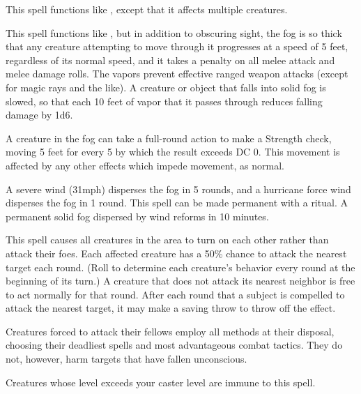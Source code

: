 \begin{spelleffect}
    This spell functions like , except that it affects multiple creatures.
\end{spelleffect}

\spelldur{\durmed}
\begin{spelleffect}
    This spell functions like , but in addition to obscuring sight, the fog is so thick that any creature attempting to move through it progresses at a speed of 5 feet, regardless of its normal speed, and it takes a  penalty on all melee attack and melee damage rolls. The vapors prevent effective ranged weapon attacks (except for magic rays and the like). A creature or object that falls into solid fog is slowed, so that each 10 feet of vapor that it passes through reduces falling damage by 1d6.
    \par A creature in the fog can take a full-round action to make a Strength check, moving 5 feet for every 5 by which the result exceeds DC 0. This movement is affected by any other effects which impede movement, as normal.
\end{spelleffect}
\begin{spellnotes}
    A severe wind (31\add mph) disperses the fog in 5 rounds, and a hurricane force wind disperses the fog in 1 round. This spell can be made permanent with a  ritual. A permanent solid fog dispersed by wind reforms in 10 minutes.
\end{spellnotes}

\spelldur{\durshort}
\begin{spelleffect}
    This spell causes all creatures in the area to turn on each other rather than attack their foes. Each affected creature has a 50\% chance to attack the nearest target each round. (Roll to determine each creature's behavior every round at the beginning of its turn.) A creature that does not attack its nearest neighbor is free to act normally for that round. After each round that a subject is compelled to attack the nearest target, it may make a saving throw to throw off the effect.
    \par Creatures forced to attack their fellows employ all methods at their disposal, choosing their deadliest spells and most advantageous combat tactics. They do not, however, harm targets that have fallen unconscious.
\end{spelleffect}
\begin{spellnotes}
    Creatures whose level exceeds your caster level are immune to this spell.
\end{spellnotes}

